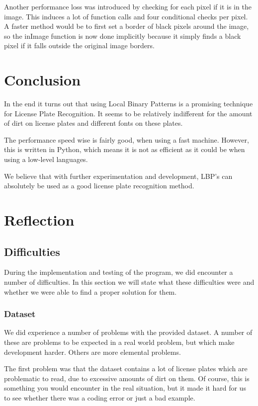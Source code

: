 \documentclass[a4paper]{article}
\begin{document}
Another performance loss was introduced by checking for each pixel if it is
in the image. This induces a lot of function calls and four conditional checks
per pixel. A faster method would be to first set a border of black pixels
around the image, so the inImage function is now done implicitly because it
simply finds a black pixel if it falls outside the original image borders.

\section{Conclusion}

In the end it turns out that using Local Binary Patterns is a promising
technique for License Plate Recognition. It seems to be relatively indifferent
for the amount of dirt on license plates and different fonts on these plates.

The performance speed wise is fairly good, when using a fast machine. However,
this is written in Python, which means it is not as efficient as it could be
when using a low-level languages.

We believe that with further experimentation and development, LBP's can
absolutely be used as a good license plate recognition method.

\section{Reflection}

\subsection{Difficulties}

During the implementation and testing of the program, we did encounter a
number of difficulties. In this section we will state what these difficulties
were and whether we were able to find a proper solution for them.

\subsubsection*{Dataset}

We did experience a number of problems with the provided dataset. A number of
these are problems to be expected in a real world problem, but which make
development harder. Others are more elemental problems.

The first problem was that the dataset contains a lot of license plates which
are problematic to read, due to excessive amounts of dirt on them. Of course,
this is something you would encounter in the real situation, but it made it
hard for us to see whether there was a coding error or just a bad example.
\end{document}
